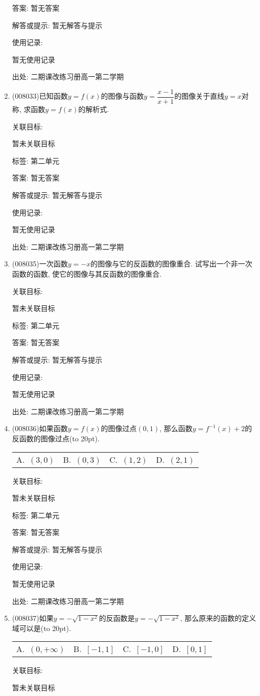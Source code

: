 \documentclass[10pt,a4paper]{article}
\newcommand{\bracket}[1]{(\hbox to #1pt{})}
\newcommand{\fourch}[4]{\par\begin{tabular}{p{.23\textwidth}p{.23\textwidth}p{.23\textwidth}p{.23\textwidth}}
A.~#1 &B.~#2& C.~#3& D.~#4
\end{tabular}}
\begin{document}
\begin{enumerate}[1.]
答案: 暂无答案

解答或提示: 暂无解答与提示

使用记录:

暂无使用记录


出处: 二期课改练习册高一第二学期
\item { (008033)}已知函数$y=f(x)$的图像与函数$y=\dfrac{x-1}{x+1}$的图像关于直线$y=x$对称, 求函数$y=f(x)$的解析式.


关联目标:

暂未关联目标



标签: 第二单元

答案: 暂无答案

解答或提示: 暂无解答与提示

使用记录:

暂无使用记录


出处: 二期课改练习册高一第二学期
\item { (008035)}一次函数$y=-x$的图像与它的反函数的图像重合. 试写出一个非一次函数的函数, 使它的图像与其反函数的图像重合.


关联目标:

暂未关联目标



标签: 第二单元

答案: 暂无答案

解答或提示: 暂无解答与提示

使用记录:

暂无使用记录


出处: 二期课改练习册高一第二学期
\item { (008036)}如果函数$y=f(x)$的图像过点$(0, 1)$, 那么函数$y=f^{-1}(x)+2$的反函数的图像过点\bracket{20}.
\fourch{$(3, 0)$}{$(0, 3)$}{$(1, 2)$}{$(2, 1)$}


关联目标:

暂未关联目标



标签: 第二单元

答案: 暂无答案

解答或提示: 暂无解答与提示

使用记录:

暂无使用记录


出处: 二期课改练习册高一第二学期
\item { (008037)}如果$y=-\sqrt {1-x^2}$的反函数是$y=-\sqrt {1-x^2}$, 那么原来的函数的定义域可以是\bracket{20}.
\fourch{$(0,+\infty)$}{$[-1,1]$}{$[-1,0]$}{$[0,1]$}


关联目标:

暂未关联目标




\end{enumerate}
\end{document}
